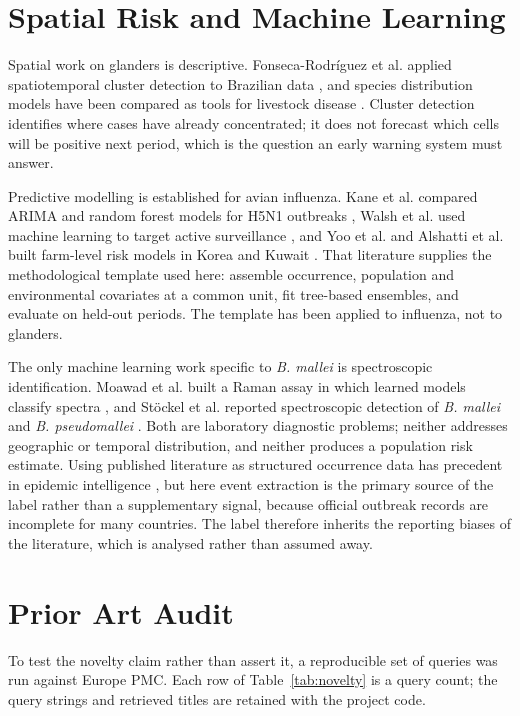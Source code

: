 \documentclass[10pt,openany]{report}
\begin{document}
\section{Spatial Risk and Machine Learning}

Spatial work on glanders is descriptive. Fonseca-Rodr\'iguez et al. applied spatiotemporal cluster
detection to Brazilian data \cite{fonseca2019}, and species distribution models have been compared as
tools for livestock disease \cite{hollings2017}. Cluster detection identifies where cases have already
concentrated; it does not forecast which cells will be positive next period, which is the question an
early warning system must answer.

Predictive modelling is established for avian influenza. Kane et al. compared ARIMA and random forest
models for H5N1 outbreaks \cite{kane2014}, Walsh et al. used machine learning to target active
surveillance \cite{walsh2019}, and Yoo et al. and Alshatti et al. built farm-level risk models in Korea
and Kuwait \cite{yoo2022,alshatti2026}. That literature supplies the methodological template used
here: assemble occurrence, population and environmental covariates at a common unit, fit tree-based
ensembles, and evaluate on held-out periods. The template has been applied to influenza, not to
glanders.

The only machine learning work specific to \textit{B. mallei} is spectroscopic identification. Moawad
et al. built a Raman assay in which learned models classify spectra \cite{moawad2019}, and St\"ockel et
al. reported spectroscopic detection of \textit{B. mallei} and \textit{B. pseudomallei}
\cite{stoeckel2015}. Both are laboratory diagnostic problems; neither addresses geographic or temporal
distribution, and neither produces a population risk estimate. Using published literature as
structured occurrence data has precedent in epidemic intelligence \cite{collier2012,lejeune2015}, but
here event extraction is the primary source of the label rather than a supplementary signal, because
official outbreak records are incomplete for many countries. The label therefore inherits the
reporting biases of the literature, which is analysed rather than assumed away.

\section{Prior Art Audit}

To test the novelty claim rather than assert it, a reproducible set of queries was run against Europe
PMC. Each row of Table~\ref{tab:novelty} is a query count; the query strings and retrieved titles are
retained with the project code.
\end{document}
